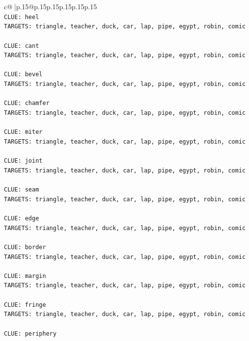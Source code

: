 \documentclass{article}
\begin{document}
{\begin{supertabular}{c@{$\;$}|p{.15\linewidth}@{}p{.15\linewidth}p{.15\linewidth}p{.15\linewidth}p{.15\linewidth}p{.15\linewidth}}
{{{\\ 
\texttt{CLUE: heel} \\
\texttt{TARGETS: triangle, teacher, duck, car, lap, pipe, egypt, robin, comic} \\
\\ 
\texttt{CLUE: cant} \\
\texttt{TARGETS: triangle, teacher, duck, car, lap, pipe, egypt, robin, comic} \\
\\ 
\texttt{CLUE: bevel} \\
\texttt{TARGETS: triangle, teacher, duck, car, lap, pipe, egypt, robin, comic} \\
\\ 
\texttt{CLUE: chamfer} \\
\texttt{TARGETS: triangle, teacher, duck, car, lap, pipe, egypt, robin, comic} \\
\\ 
\texttt{CLUE: miter} \\
\texttt{TARGETS: triangle, teacher, duck, car, lap, pipe, egypt, robin, comic} \\
\\ 
\texttt{CLUE: joint} \\
\texttt{TARGETS: triangle, teacher, duck, car, lap, pipe, egypt, robin, comic} \\
\\ 
\texttt{CLUE: seam} \\
\texttt{TARGETS: triangle, teacher, duck, car, lap, pipe, egypt, robin, comic} \\
\\ 
\texttt{CLUE: edge} \\
\texttt{TARGETS: triangle, teacher, duck, car, lap, pipe, egypt, robin, comic} \\
\\ 
\texttt{CLUE: border} \\
\texttt{TARGETS: triangle, teacher, duck, car, lap, pipe, egypt, robin, comic} \\
\\ 
\texttt{CLUE: margin} \\
\texttt{TARGETS: triangle, teacher, duck, car, lap, pipe, egypt, robin, comic} \\
\\ 
\texttt{CLUE: fringe} \\
\texttt{TARGETS: triangle, teacher, duck, car, lap, pipe, egypt, robin, comic} \\
\\ 
\texttt{CLUE: periphery} \\
}}}
\end{supertabular}}
\end{document}
